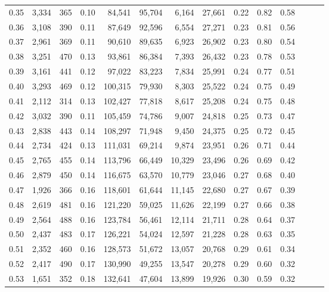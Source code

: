 \begin{tabular}{rrrrrrrrrrrrrr}
0.35 &  3,334 &    365 &  0.10 &   84,541 &   95,704 &   6,164 &  27,661 &  0.22 &  0.82 &      0.58 \\
0.36 &  3,108 &    390 &  0.11 &   87,649 &   92,596 &   6,554 &  27,271 &  0.23 &  0.81 &      0.56 \\
0.37 &  2,961 &    369 &  0.11 &   90,610 &   89,635 &   6,923 &  26,902 &  0.23 &  0.80 &      0.54 \\
0.38 &  3,251 &    470 &  0.13 &   93,861 &   86,384 &   7,393 &  26,432 &  0.23 &  0.78 &      0.53 \\
0.39 &  3,161 &    441 &  0.12 &   97,022 &   83,223 &   7,834 &  25,991 &  0.24 &  0.77 &      0.51 \\
0.40 &  3,293 &    469 &  0.12 &  100,315 &   79,930 &   8,303 &  25,522 &  0.24 &  0.75 &      0.49 \\
0.41 &  2,112 &    314 &  0.13 &  102,427 &   77,818 &   8,617 &  25,208 &  0.24 &  0.75 &      0.48 \\
0.42 &  3,032 &    390 &  0.11 &  105,459 &   74,786 &   9,007 &  24,818 &  0.25 &  0.73 &      0.47 \\
0.43 &  2,838 &    443 &  0.14 &  108,297 &   71,948 &   9,450 &  24,375 &  0.25 &  0.72 &      0.45 \\
0.44 &  2,734 &    424 &  0.13 &  111,031 &   69,214 &   9,874 &  23,951 &  0.26 &  0.71 &      0.44 \\
0.45 &  2,765 &    455 &  0.14 &  113,796 &   66,449 &  10,329 &  23,496 &  0.26 &  0.69 &      0.42 \\
0.46 &  2,879 &    450 &  0.14 &  116,675 &   63,570 &  10,779 &  23,046 &  0.27 &  0.68 &      0.40 \\
0.47 &  1,926 &    366 &  0.16 &  118,601 &   61,644 &  11,145 &  22,680 &  0.27 &  0.67 &      0.39 \\
0.48 &  2,619 &    481 &  0.16 &  121,220 &   59,025 &  11,626 &  22,199 &  0.27 &  0.66 &      0.38 \\
0.49 &  2,564 &    488 &  0.16 &  123,784 &   56,461 &  12,114 &  21,711 &  0.28 &  0.64 &      0.37 \\
0.50 &  2,437 &    483 &  0.17 &  126,221 &   54,024 &  12,597 &  21,228 &  0.28 &  0.63 &      0.35 \\
0.51 &  2,352 &    460 &  0.16 &  128,573 &   51,672 &  13,057 &  20,768 &  0.29 &  0.61 &      0.34 \\
0.52 &  2,417 &    490 &  0.17 &  130,990 &   49,255 &  13,547 &  20,278 &  0.29 &  0.60 &      0.32 \\
0.53 &  1,651 &    352 &  0.18 &  132,641 &   47,604 &  13,899 &  19,926 &  0.30 &  0.59 &      0.32 \\

\end{tabular}
